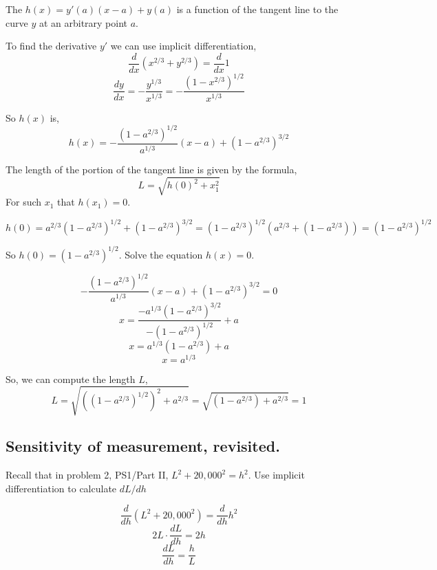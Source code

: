 \documentclass{article}
\begin{document}
The $h(x) = y'(a)(x-a) + y(a)$ is a function of the tangent line to the curve $y$ at an arbitrary point $a$.

To find the derivative $y'$ we can use implicit differentiation,
\[ \frac{d}{dx}(x^{2/3} + y^{2/3}) = \frac{d}{dx} 1 \]
\[ \frac{dy}{dx} = -\frac{y^{1/3}}{x^{1/3}} = -\frac{(1-x^{2/3})^{1/2}}{x^{1/3}} \]

So $h(x)$ is,
\[ h(x) =  -\frac{(1-a^{2/3})^{1/2}}{a^{1/3}}(x-a) + (1-a^{2/3})^{3/2}\]

The length of the portion of the tangent line is given by the formula,
\[ L = \sqrt{h(0)^2 + x_1^2}\]
For such $x_1$ that $h(x_1) = 0$.

\[ h(0) = a^{2/3}(1-a^{2/3})^{1/2} + (1-a^{2/3})^{3/2} = (1-a^{2/3})^{1/2}(a^{2/3} + (1-a^{2/3})) = (1-a^{2/3})^{1/2}\]

So $h(0) = (1-a^{2/3})^{1/2}$. Solve the equation $h(x) = 0$.

\[ -\frac{(1-a^{2/3})^{1/2}}{a^{1/3}}(x-a) + (1-a^{2/3})^{3/2} = 0 \]
\[ x = \frac{-a^{1/3}(1-a^{2/3})^{3/2}}{-(1-a^{2/3})^{1/2}}  + a \]
\[ x = a^{1/3}(1-a^{2/3}) + a \]
\[ x = a^{1/3}\]

So, we can compute the length $L$,
\[ L = \sqrt{\left((1-a^{2/3})^{1/2}\right)^2 + a^{2/3}} = \sqrt{(1-a^{2/3}) + a^{2/3}} = 1\]

\subsection{Sensitivity of measurement, revisited.}
\begin{tcolorbox}
  Recall that in problem 2, PS1/Part II, \( L^2 + 20,000^2 = h^2 \). Use implicit differentiation
  to calculate \( dL/dh \)
\end{tcolorbox}

\[ \frac{d}{dh} \left( L^2+20,000^2 \right) = \frac{d}{dh}h^2 \]
\[ 2L\cdot \frac{dL}{dh} = 2h \]
\[ \frac{dL}{dh} = \frac{h}{L} \]
\end{document}

